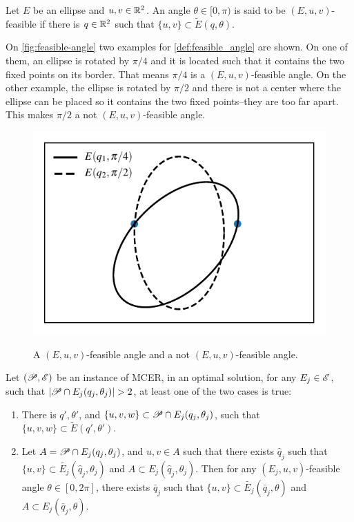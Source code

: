 \begin{definicao}\label{def:feasible_angle}
	Let $E$ be an ellipse and $u, v \in \mathbb{R}^2$. An angle $\theta \in [0, \pi)$ is said to be $(E, u, v)$-feasible if there is $q \in \mathbb{R}^2$ such that $\{u, v\} \subset \tilde{E}(q, \theta)$.
\end{definicao}

On \autoref{fig:feasible-angle} two examples for \autoref{def:feasible_angle} are shown. On one of them, an ellipse is rotated by $\pi/4$ and it is located such that it contains the two fixed points on its border. That means $\pi/4$ is a $(E, u, v)$-feasible angle. On the other example, the ellipse is rotated by $\pi/2$ and there is not a center where the ellipse can be placed so it contains the two fixed points--they are too far apart. This makes $\pi/2$ a not $(E, u, v)$-feasible angle.

\begin{figure}
	\centering
	\caption{A $(E, u, v)$-feasible angle and a not $(E, u, v)$-feasible angle.}
	\includegraphics{tex/figures/scripts/feasible-angle}
	\fautor
	\label{fig:feasible-angle}
\end{figure}

\begin{lema}\label{lema:3pnts}
	Let $(\mathscr{P}, \mathscr{E})$ be an instance of MCER, in an optimal solution, for any $E_j \in \mathscr{E}$, such that $|\Pp \cap E_j(q_j, \theta_j)|>2$, at least one of the two cases is true:
	
	\begin{enumerate}
		\item There is $q', \theta'$, and $\{u, v, w\} \subset \mathscr{P} \cap E_j(q_j, \theta_j)$, such that $\{u, v, w\} \subset \tilde{E}(q', \theta')$.
		
		\item Let $A=\mathscr{P} \cap E_j(q_j, \theta_j)$, and $u, v \in A$ such that there exists $\hat{q}_j$ such that $\{u, v\} \subset \tilde{E_j}(\hat{q}_j, \theta_j)$ and $A \subset E_j(\hat{q}_j, \theta_j)$. Then for any $(E_j, u, v)$-feasible angle $\theta \in [0, 2\pi]$, there exists $\bar{q}_j$ such that $\{u, v\} \subset \tilde{E_j}(\bar{q}_j, \theta)$ and $A \subset E_j(\bar{q}_j, \theta)$.
	\end{enumerate}
\end{lema}

